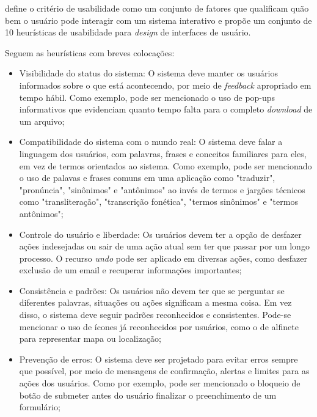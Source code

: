  define o critério de usabilidade como um conjunto de fatores que qualificam 
quão bem o usuário pode interagir com um sistema interativo e propõe um conjunto de 10 
heurísticas de usabilidade para \textit{design} de interfaces de usuário.

\begin{description}
  \item Seguem as heurísticas com breves colocações:
        \begin{itemize}
            \item Visibilidade do status do sistema: O sistema deve manter os usuários informados sobre o que está 
            acontecendo, por meio de \textit{feedback} apropriado em tempo hábil. Como exemplo, pode ser mencionado 
            o uso de pop-ups informativos que evidenciam quanto tempo falta para o completo \textit{download} de um arquivo;

            \item Compatibilidade do sistema com o mundo real: O sistema deve falar a linguagem dos usuários, com 
            palavras, frases e conceitos familiares para eles, em vez de termos orientados ao sistema. Como exemplo, pode ser 
            mencionado o uso de palavas e frases comuns em uma aplicação como "traduzir", "pronúncia", "sinônimos" e "antônimos" 
            ao invés de termos e jargões técnicos como "transliteração", "transcrição fonética", "termos sinônimos" e "termos antônimos";

            \item Controle do usuário e liberdade: Os usuários devem ter a opção de desfazer ações indesejadas ou sair 
            de uma ação atual sem ter que passar por um longo processo. O recurso \textit{undo} pode ser aplicado em diversas ações, como 
            desfazer exclusão de um email e recuperar informações importantes;

            \item Consistência e padrões: Os usuários não devem ter que se perguntar se diferentes palavras, situações 
            ou ações significam a mesma coisa. Em vez disso, o sistema deve seguir padrões reconhecidos e consistentes. Pode-se mencionar o uso 
            de ícones já reconhecidos por usuários, como o de alfinete para representar mapa ou localização;

            \item Prevenção de erros: O sistema deve ser projetado para evitar erros sempre que possível, por meio de 
            mensagens de confirmação, alertas e limites para as ações dos usuários. Como por exemplo, pode ser mencionado 
            o bloqueio de botão de submeter antes do usuário finalizar o preenchimento de um formulário;
            

\end{itemize}
\end{description}
